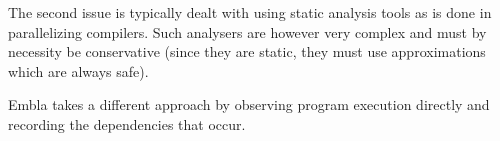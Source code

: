 The second issue is typically
dealt with using static analysis tools as is done in parallelizing
compilers. Such analysers are however very complex and must by
necessity be conservative (since they are static, they must use
approximations which are always safe).

Embla takes a different approach by observing program execution
directly and recording the dependencies that occur.



